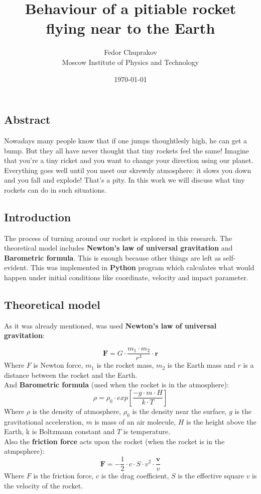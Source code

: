 \documentclass[a4paper,12pt]{article}
\author{Fedor Chuprakov\\ Moscow Institute of Physics and Technology}
\title{Behaviour of a pitiable rocket flying near to the Earth}
\date{\today}
\begin{document}
\maketitle
\newpage
\subsection*{Abstract}
Nowadays many people know that if one jumps thoughtlesly high, he can get a 
bump. But they all have never thought that tiny rockets feel the same! Imagine that
you're a tiny ricket and you want to change your direction using our planet.
Everything goes well until you meet our skrewdy atmosphere: it slows you down and you fall and explode! That's a pity. In this work we will discuss what tiny rockets can do in such situations.
\subsection*{Introduction}
The process of turning around our rocket is explored in this research.
The theoretical model includes \textbf{Newton's law of universal gravitation
} and \textbf{Barometric formula}. This is enough because other things are left as self-evident. This was implemented in \textbf{Python} program which calculates what would happen under initial conditions like coordinate, velocity and impact parameter.
\subsection*{Theoretical model}
As it was already mentioned, was used \textbf{Newton's law of universal gravitation}:

\begin{equation}\label{Newton}
	\textbf{F}=G\cdot \frac{m_1\cdot m_2}{r^3} \cdot \textbf{r}
\end{equation}
Where \textit{$F$} is Newton force, \textit{$m_1$} is the rocket mass, \textit{$m_2$} is the Earth mass and \textit{$r$} is a distance between the rocket and the Earth.\\
And \textbf{Barometric formula} (used when the rocket is in the atmosphere):
\begin{equation}\label{Barometric}
	\rho = \rho_0 \cdot exp \left[ \frac{-g \cdot m \cdot H}{k \cdot T} \right]
\end{equation}
Where \textit{$\rho$} is the density of atmosphere, \textit{$\rho_0$} is the density near the surface, \textit{$g$} is the gravitational acceleration, \textit{$m$} is mass of an air molecule, \textit{$H$} is the height above the Earth, k is Boltzmann constant and \textit{$T$} is temperature.\\
Also the \textbf{friction force} acts upon the rocket (when the rocket is in the atmpsphere):
\begin{equation}\label{Resistance}
	\textbf{F} = -\frac{1}{2} \cdot c \cdot S \cdot v^2 \cdot \frac{\textbf{v}}{v}
\end{equation}
Where \textit{$F$} is the friction force, \textit{$c$} is the drag coefficient, \textit{$S$} is the effective square \textit{$v$} is the velocity of the rocket.
\end{document}

